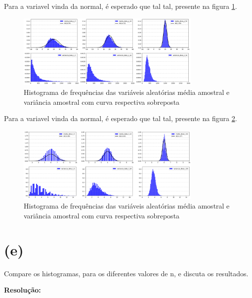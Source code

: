 \documentclass[]{abntex2}
\begin{document}
Para a variavel vinda da normal, é esperado que tal tal, presente na figura \ref{fig:medvarY}.

\begin{figure}
    \centering 
    \includegraphics[width=0.8\textwidth]{imgs/medvarY.png}
    \caption{Histograma de frequências das variáveis aleatórias média amostral e variância amostral com curva respectiva sobreposta}
    \label{fig:medvarY} %
\end{figure}

Para a variavel vinda da normal, é esperado que tal tal, presente na figura \ref{fig:medvarT}.

\begin{figure}
    \centering 
    \includegraphics[width=0.8\textwidth]{imgs/medvarT.png}
    \caption{Histograma de frequências das variáveis aleatórias média amostral e variância amostral com curva respectiva sobreposta}
    \label{fig:medvarT} %
\end{figure}

\section*{\textbf{(e)}}

\noindent Compare os histogramas, para os diferentes valores de n, e discuta os resultados.

\textbf{Resolução:}


\postextual


\end{document}
